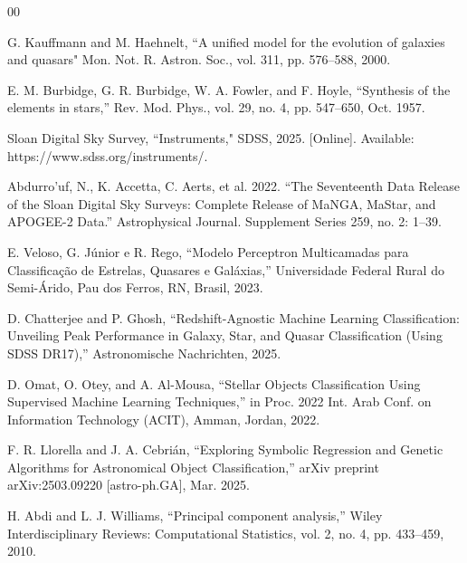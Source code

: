 \documentclass[conference]{IEEEtran}
\begin{document}
\begin{thebibliography}{00}

 G. Kauffmann and M. Haehnelt, “A unified model for the evolution of galaxies and quasars" Mon. Not. R. Astron. Soc., vol. 311, pp. 576–588, 2000.

 E. M. Burbidge, G. R. Burbidge, W. A. Fowler, and F. Hoyle, “Synthesis of the elements in stars,” Rev. Mod. Phys., vol. 29, no. 4, pp. 547–650, Oct. 1957.

 Sloan Digital Sky Survey, “Instruments," SDSS, 2025. [Online]. Available: https://www.sdss.org/instruments/.

 Abdurro’uf, N., K. Accetta, C. Aerts, et al. 2022. “The Seventeenth Data Release of the Sloan Digital Sky Surveys: Complete Release of MaNGA, MaStar, and APOGEE-2 Data.” Astrophysical Journal. Supplement Series 259, no. 2: 1–39.

 E. Veloso, G. Júnior e R. Rego, “Modelo Perceptron Multicamadas para Classificação de Estrelas, Quasares e Galáxias,” Universidade Federal Rural do Semi-Árido, Pau dos Ferros, RN, Brasil, 2023.

 D. Chatterjee and P. Ghosh, “Redshift-Agnostic Machine Learning Classification: Unveiling Peak Performance in Galaxy, Star, and Quasar Classification (Using SDSS DR17),” Astronomische Nachrichten, 2025.

 D. Omat, O. Otey, and A. Al-Mousa, “Stellar Objects Classification Using Supervised Machine Learning Techniques,” in Proc. 2022 Int. Arab Conf. on Information Technology (ACIT), Amman, Jordan, 2022.

 F. R. Llorella and J. A. Cebrián, “Exploring Symbolic Regression and Genetic Algorithms for Astronomical Object Classification,” arXiv preprint arXiv:2503.09220 [astro-ph.GA], Mar. 2025.


 H. Abdi and L. J. Williams, “Principal component analysis,” Wiley Interdisciplinary Reviews: Computational Statistics, vol. 2, no. 4, pp. 433–459, 2010.



\end{thebibliography}
\end{document}
